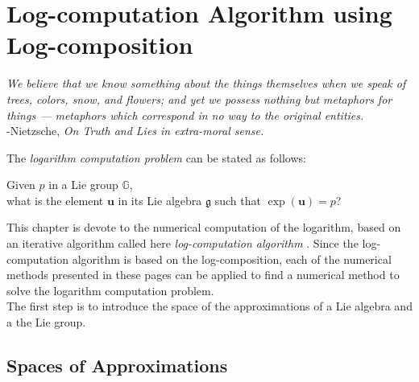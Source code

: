 \chapter{Log-computation Algorithm using Log-composition}\label{ch:log_computations}

\begin{flushright}
	\emph{We believe that we know something about the things themselves when we speak of trees, colors, snow, and flowers; and yet we possess nothing but metaphors for things — metaphors which correspond in no way to the original entities.} \\ -Nietzsche, \emph{On Truth and Lies in extra-moral sense.}
\end{flushright}

\vspace{0.5 cm}

\noindent
The \emph{logarithm computation problem} can be stated as follows:
\begin{center}
\begin{emph}
	Given $p$ in a Lie group $\mathbb{G}$, \\ what is the element $\mathbf{u}$ in its Lie algebra $\mathfrak{g}$ such that $\exp(\mathbf{u}) = p$?  
\end{emph}
\end{center}
This chapter is devote to the numerical computation of the logarithm, based on an iterative algorithm called here \emph{log-computation algorithm} \cite{Bossa:08}. Since the log-computation algorithm is based on the log-composition, each of the numerical methods presented in these pages can be applied to find a numerical method to solve the logarithm computation problem.\\

The first step is to introduce the space of the approximations of a Lie algebra and a the Lie group.


\section{Spaces of Approximations}

